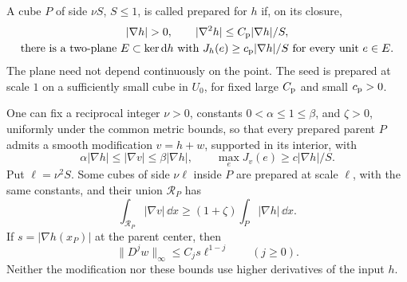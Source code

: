 A cube \(P\) of side \(\nu S\), \(S\le1\), is called prepared for \(h\)
if, on its closure,
\begin{equation}\label{eq:prepared}
\begin{gathered}
 |\nabla h|>0,\qquad
 |\nabla^2h|\le C_{\rm p}|\nabla h|/S,\\
 \text{there is a two-plane }E\subset\ker\dd h
 \text{ with }J_h(e)\ge c_{\rm p}|\nabla h|/S
 \text{ for every unit }e\in E.
\end{gathered}
\end{equation}
The plane need not depend continuously on the point. The seed is
prepared at scale \(1\) on a sufficiently small cube in \(U_0\),
for fixed large \(C_{\rm p}\) and small \(c_{\rm p}>0\).

\begin{lemma}\label{lem:corrugation}
One can fix a reciprocal integer \(\nu>0\), constants
\(0<\alpha\le1\le\beta\), and \(\zeta>0\), uniformly under the
common metric bounds, so that every prepared parent \(P\) admits a
smooth modification \(v=h+w\), supported in its interior, with
\[
 \alpha|\nabla h|\le|\nabla v|\le\beta|\nabla h|,\qquad
 \max_eJ_v(e)\ge c|\nabla h|/S.
\]
Put \(\ell=\nu^2S\). Some cubes of side \(\nu\ell\) inside \(P\)
are prepared at scale \(\ell\), with the same constants, and their
union \(\mathcal R_P\) has
\begin{equation}\label{eq:gain}
 \int_{\mathcal R_P}|\nabla v|\,\dd x
 \ge(1+\zeta)\int_P|\nabla h|\,\dd x.
\end{equation}
If \(s=|\nabla h(x_P)|\) at the parent center, then
\begin{equation}\label{eq:increment}
 \|D^jw\|_\infty\le C_j s\ell^{1-j}\qquad(j\ge0).
\end{equation}
Neither the modification nor these bounds use higher derivatives
of the input \(h\).
\end{lemma}


